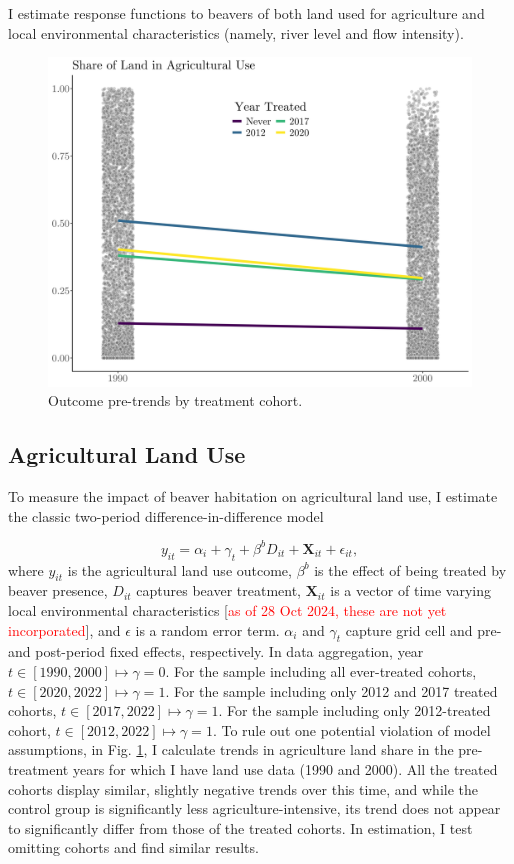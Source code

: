 I estimate response functions to beavers of both land used for agriculture and local environmental characteristics (namely, river level and flow intensity).

\begin{figure}
    \centering
    \includegraphics[width=0.7\linewidth]{output/figures/outcome_pretrends.png}
    \caption{Outcome pre-trends by treatment cohort.}
    \label{fig:outcome-pretrends}
\end{figure}

\subsection{Agricultural Land Use}

To measure the impact of beaver habitation on agricultural land use, I estimate the classic two-period difference-in-difference model

\begin{equation} \label{eq:main_beaver_eq}
y_{it} = \alpha_i + \gamma_t + \beta^{b}D_{it} + \mathbf{X}_{it} + \epsilon_{it},
\end{equation}
where $y_{it}$ is the agricultural land use outcome, $\beta^b$ is the effect of being treated by beaver presence, $D_{it}$ captures beaver treatment, $\mathbf{X}_{it}$ is a vector of time varying local environmental characteristics [\textcolor{red}{as of 28 Oct 2024, these are not yet incorporated}], and $\epsilon$ is a random error term. $\alpha_i$ and $\gamma_t$ capture grid cell and pre-and post-period fixed effects, respectively. In data aggregation, year $t \in [1990, 2000] \mapsto \gamma = 0$. For the sample including all ever-treated cohorts, $t \in [2020, 2022] \mapsto \gamma = 1$. For the sample including only 2012 and 2017 treated cohorts, $t \in [2017, 2022] \mapsto \gamma = 1$. For the sample including only 2012-treated cohort, $t \in [2012, 2022] \mapsto \gamma = 1$. To rule out one potential violation of model assumptions, in Fig. \ref{fig:outcome-pretrends}, I calculate trends in agriculture land share in the pre-treatment years for which I have land use data (1990 and 2000). All the treated cohorts display similar, slightly negative trends over this time, and while the control group is significantly less agriculture-intensive, its trend does not appear to significantly differ from those of the treated cohorts. In estimation, I test omitting cohorts and find similar results.
